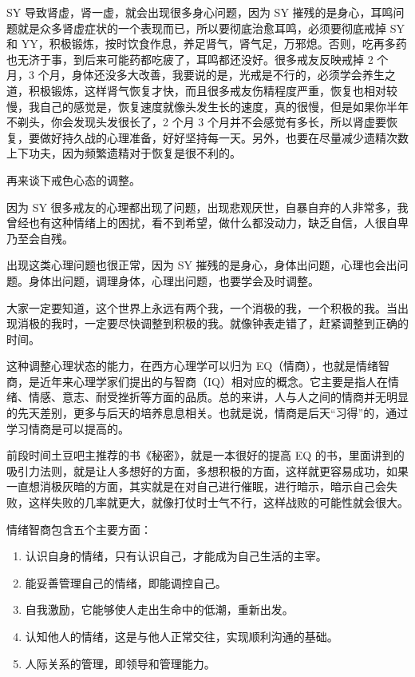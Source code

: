 \documentclass{ctexart}
\begin{document}
SY 导致肾虚，肾一虚，就会出现很多身心问题，因为 SY 摧残的是身心，耳鸣问题就是众多肾虚症状的一个表现而已，所以要彻底治愈耳鸣，必须要彻底戒掉 SY 和 YY，积极锻炼，按时饮食作息，养足肾气，肾气足，万邪熄。否则，吃再多药也无济于事，到后来可能药都吃疲了，耳鸣都还没好。很多戒友反映戒掉 2 个月，3 个月，身体还没多大改善，我要说的是，光戒是不行的，必须学会养生之道，积极锻炼，这样肾气恢复才快，而且很多戒友伤精程度严重，恢复也相对较慢，我自己的感觉是，恢复速度就像头发生长的速度，真的很慢，但是如果你半年不剃头，你会发现头发很长了，2 个月 3 个月并不会感觉有多长，所以肾虚要恢复，要做好持久战的心理准备，好好坚持每一天。另外，也要在尽量减少遗精次数上下功夫，因为频繁遗精对于恢复是很不利的。

再来谈下戒色心态的调整。

因为 SY 很多戒友的心理都出现了问题，出现悲观厌世，自暴自弃的人非常多，我曾经也有这种情绪上的困扰，看不到希望，做什么都没动力，缺乏自信，人很自卑乃至会自残。

出现这类心理问题也很正常，因为 SY 摧残的是身心，身体出问题，心理也会出问题。身体出问题，调理身体，心理出问题，也要学会及时调整。

大家一定要知道，这个世界上永远有两个我，一个消极的我，一个积极的我。当出现消极的我时，一定要尽快调整到积极的我。就像钟表走错了，赶紧调整到正确的时间。

这种调整心理状态的能力，在西方心理学可以归为 EQ（情商），也就是情绪智商，是近年来心理学家们提出的与智商（IQ）相对应的概念。它主要是指人在情绪、情感、意志、耐受挫折等方面的品质。总的来讲，人与人之间的情商并无明显的先天差别，更多与后天的培养息息相关。也就是说，情商是后天“习得”的，通过学习情商是可以提高的。

前段时间土豆吧主推荐的书《秘密》，就是一本很好的提高 EQ 的书，里面讲到的吸引力法则，就是让人多想好的方面，多想积极的方面，这样就更容易成功，如果一直想消极灰暗的方面，其实就是在对自己进行催眠，进行暗示，暗示自己会失败，这样失败的几率就更大，就像打仗时士气不行，这样战败的可能性就会很大。

情绪智商包含五个主要方面：

\begin{enumerate}
    \item 认识自身的情绪，只有认识自己，才能成为自己生活的主宰。
    \item 能妥善管理自己的情绪，即能调控自己。
    \item 自我激励，它能够使人走出生命中的低潮，重新出发。
    \item 认知他人的情绪，这是与他人正常交往，实现顺利沟通的基础。
    \item 人际关系的管理，即领导和管理能力。
\end{enumerate}
\end{document}
